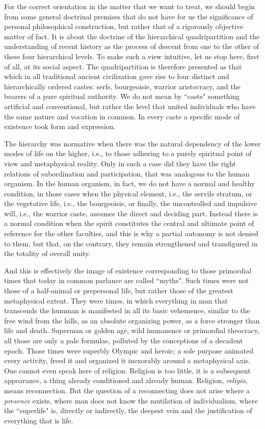 For the correct orientation in the matter that we want to treat, we should begin from some general doctrinal premises that do not have for us the significance of personal philosophical construction, but rather that of a rigorously objective matter of fact. It is about the doctrine of the hierarchical quadripartition and the understanding of recent history as the process of descent from one to the other of these four hierarchical levels. To make such a view intuitive, let us stop here, first of all, at its social aspect. The quadripartition is therefore presented as that which in all traditional ancient civilization gave rise to four distinct and hierarchically ordered castes: serfs, bourgeoisie, warrior aristocracy, and the bearers of a pure spiritual authority. We do not mean by ``caste" something artificial and conventional, but rather the level that united individuals who have the same nature and vocation in common. In every caste a specific mode of existence took form and expression.

The hierarchy was normative when there was the natural dependency of the lower modes of life on the higher, i.e., to those adhering to a purely spiritual point of view and metaphysical reality. Only in such a case did they have the right relations of subordination and participation, that was analogous to the human organism. In the human organism, in fact, we do not have a normal and healthy condition, in those cases when the physical element, i.e., the servile stratum, or the vegetative life, i.e., the bourgeoisie, or finally, the uncontrolled and impulsive will, i.e., the warrior caste, assumes the direct and deciding part. Instead there is a normal condition when the spirit constitutes the central and ultimate point of reference for the other faculties, and this is why a partial autonomy is not denied to them, but that, on the contrary, they remain strengthened and transfigured in the totality of overall unity.

And this is effectively the image of existence corresponding to those primordial times that today in common parlance are called ``myths". Such times were not those of a half-animal or prepersonal life, but rather those of the greatest metaphysical extent. They were times, in which everything in man that transcends the humman is manifested in all its basic vehemence, similar to the free wind from the hills, as an absolute organizing power, as a force stronger than life and death. Superman or golden age, wild immanence or primordial theocracy, all those are only a pale formulae, polluted by the conceptions of a decadent epoch. Those times were superbly Olympic and heroic; a sole purpose animated every activity, freed it and organized it inexorably around a metaphysical axis. One cannot even speak here of religion. Religion is too little, it is a subsequent appearance, a thing already conditioned and already human. Religion, \emph{religio}, means reconnection. But the question of a reconnecting does not arise where a \emph{presence} exists, where man does not know the mutilation of individualism, where the ``superlife" is, directly or indirectly, the deepest vein and the justification of everything that is life.


